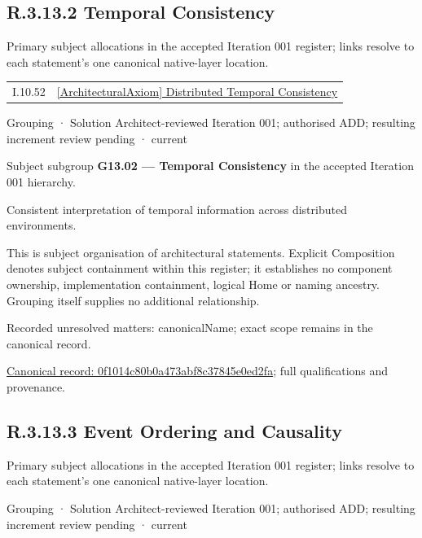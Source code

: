 \subsection*{R.3.13.2 Temporal Consistency}
\label{navigation:R.3.13.2}

Primary subject allocations in the accepted Iteration 001 register; links resolve to each statement’s one canonical native-layer location.\par
\begin{longtable}{p{.22\linewidth}p{.73\linewidth}}
I.10.52 & \hyperref[element:ed3e8d7923d14f8cbc6f08d3673248f2]{[ArchitecturalAxiom] Distributed Temporal Consistency} \\
\end{longtable}
\label{element:0f1014c80b0a473abf8c37845e0ed2fa}
{\small Grouping · Solution Architect-reviewed Iteration 001; authorised ADD; resulting increment review pending · current}\par

Subject subgroup \textbf{G13.02 — Temporal Consistency} in the accepted Iteration 001 hierarchy.



Consistent interpretation of temporal information across distributed environments.



This is subject organisation of architectural statements. Explicit Composition denotes subject containment within this register; it establishes no component ownership, implementation containment, logical Home or naming ancestry. Grouping itself supplies no additional relationship.


{\small Recorded unresolved matters: canonicalName; exact scope remains in the canonical record.}\par
{\footnotesize \href{../../../../continuum/grouping/0f1014c80b0a473abf8c37845e0ed2fa.md}{Canonical record: 0f1014c80b0a473abf8c37845e0ed2fa}; full qualifications and provenance.}\par
\subsection*{R.3.13.3 Event Ordering and Causality}
\label{navigation:R.3.13.3}

Primary subject allocations in the accepted Iteration 001 register; links resolve to each statement’s one canonical native-layer location.\par
\label{element:432d52cc3de5443896a4559f215ece9f}
{\small Grouping · Solution Architect-reviewed Iteration 001; authorised ADD; resulting increment review pending · current}\par

